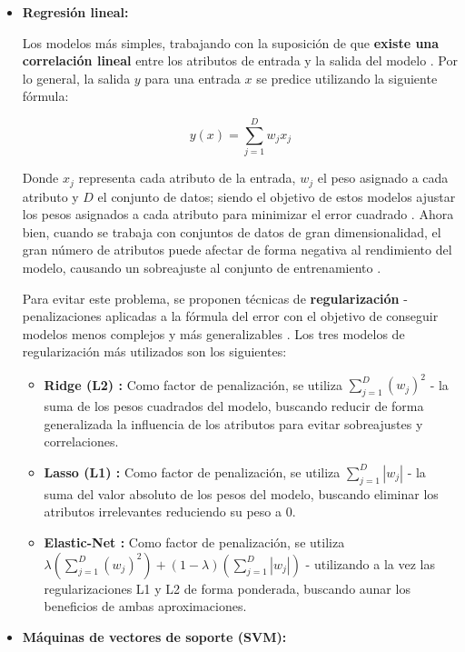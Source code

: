 \begin{itemize}[leftmargin=*, parsep=2pt, itemsep=2pt, topsep=4pt]
	\item \textbf{Regresión lineal:} 
	
	Los modelos más simples, trabajando con la suposición de que \textbf{existe una correlación lineal} entre los atributos de entrada y la salida del modelo \cite{mlprobabilistic}. Por lo general, la salida $y$ para una entrada $x$ se predice utilizando la siguiente fórmula: 

	$$y(x) = \sum_{j=1}^{D}w_j x_j$$
	
	Donde $x_j$ representa cada atributo de la entrada, $w_j$ el peso asignado a cada atributo y $D$ el conjunto de datos; siendo el objetivo de estos modelos ajustar los pesos asignados a cada atributo para minimizar el error cuadrado \cite{aima}. Ahora bien, cuando se trabaja con conjuntos de datos de gran dimensionalidad, el gran número de atributos puede afectar de forma negativa al rendimiento del modelo, causando un sobreajuste al conjunto de entrenamiento \cite{l1l2}.
	
	Para evitar este problema, se proponen técnicas de \textbf{regularización} - penalizaciones aplicadas a la fórmula del error con el objetivo de conseguir modelos menos complejos y más generalizables \cite{elasticnet}. Los tres modelos de regularización más utilizados son los siguientes:
	
	\begin{itemize}[parsep=1pt, itemsep=1pt, topsep=4pt]
		\item \textbf{Ridge (L2) \cite{ridge}:} Como factor de penalización, se utiliza $\sum_{j=1}^D(w_j)^2$ - la suma de los pesos cuadrados del modelo, buscando reducir de forma generalizada la influencia de los atributos para evitar sobreajustes y correlaciones.
		\item \textbf{Lasso (L1) \cite{lasso}:} Como factor de penalización, se utiliza $\sum_{j=1}^D|w_j|$ - la suma del valor absoluto de los pesos del modelo, buscando eliminar los atributos irrelevantes reduciendo su peso a $0$.
		\item \textbf{Elastic-Net \cite{elasticnet}:} Como factor de penalización, se utiliza $\lambda\left(\sum_{j=1}^D(w_j)^2\right) + (1-\lambda)\left(\sum_{j=1}^D|w_j|\right)$ - utilizando a la vez las regularizaciones L1 y L2 de forma ponderada, buscando aunar los beneficios de ambas aproximaciones.
	\end{itemize}

	\item \textbf{Máquinas de vectores de soporte (SVM):} 
	

\end{itemize}
